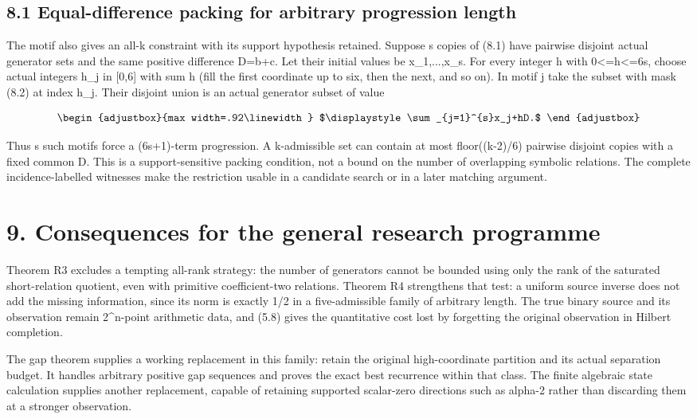 \subsection{8.1 Equal-difference packing for arbitrary progression length}\label{n14-equal-difference-packing-for-arbitrary-progression-length}

The motif also gives an all-k constraint with its support hypothesis retained. Suppose s copies of (8.1) have pairwise disjoint actual generator sets and the same positive difference D=b+c. Let their initial values be x\_1,...,x\_s. For every integer h with 0\textless=h\textless=6s, choose actual integers h\_j in {[}0,6{]} with sum h (fill the first coordinate up to six, then the next, and so on). In motif j take the subset with mask (8.2) at index h\_j. Their disjoint union is an actual generator subset of value

\[
\begin{adjustbox}{max width=.92\linewidth}
$\displaystyle \sum_{j=1}^{s}x_j+hD.$
\end{adjustbox}
\]

Thus s such motifs force a (6s+1)-term progression. A k-admissible set can contain at most floor((k-2)/6) pairwise disjoint copies with a fixed common D. This is a support-sensitive packing condition, not a bound on the number of overlapping symbolic relations. The complete incidence-labelled witnesses make the restriction usable in a candidate search or in a later matching argument.

\section{9. Consequences for the general research programme}\label{n14-consequences-for-the-general-research-programme}

Theorem R3 excludes a tempting all-rank strategy: the number of generators cannot be bounded using only the rank of the saturated short-relation quotient, even with primitive coefficient-two relations. Theorem R4 strengthens that test: a uniform source inverse does not add the missing information, since its norm is exactly 1/2 in a five-admissible family of arbitrary length. The true binary source and its observation remain 2\^{}n-point arithmetic data, and (5.8) gives the quantitative cost lost by forgetting the original observation in Hilbert completion.

The gap theorem supplies a working replacement in this family: retain the original high-coordinate partition and its actual separation budget. It handles arbitrary positive gap sequences and proves the exact best recurrence within that class. The finite algebraic state calculation supplies another replacement, capable of retaining supported scalar-zero directions such as alpha-2 rather than discarding them at a stronger observation.


